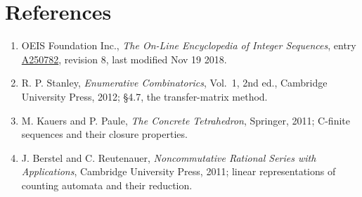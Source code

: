 \documentclass[11pt]{article}
\theoremstyle{definition}
\begin{document}
\section{References}

\begin{enumerate}

\item OEIS Foundation Inc., \emph{The On-Line Encyclopedia of Integer Sequences}, entry \href{https://oeis.org/A250782}{A250782}, revision 8, last modified Nov 19 2018.

\item R. P. Stanley, \emph{Enumerative Combinatorics}, Vol.~1, 2nd ed., Cambridge University Press, 2012; \S4.7, the transfer-matrix method.

\item M. Kauers and P. Paule, \emph{The Concrete Tetrahedron}, Springer, 2011; C-finite sequences and their closure properties.

\item J. Berstel and C. Reutenauer, \emph{Noncommutative Rational Series with Applications}, Cambridge University Press, 2011; linear representations of counting automata and their reduction.

\end{enumerate}
\end{document}
